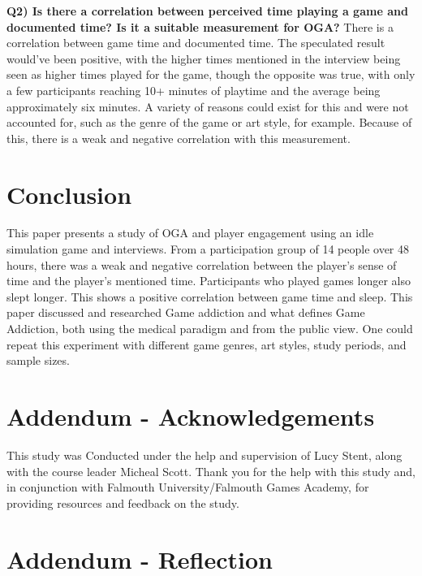 \documentclass[conference]{IEEEtran}
\begin{document}
 \textbf{Q2) Is there a correlation between perceived time playing a game and documented time? Is it a suitable measurement for OGA?}
There is a correlation between game time and documented time. The speculated result would’ve been positive, with the higher times mentioned in the interview being seen as higher times played for the game, though the opposite was true, with only a few participants reaching 10+ minutes of playtime and the average being approximately six minutes. A variety of reasons could exist for this and were not accounted for, such as the genre of the game or art style, for example. Because of this, there is a weak and negative correlation with this measurement.

\section{Conclusion}
This paper presents a study of OGA and player engagement using an idle simulation game and interviews. From a participation group of 14 people over 48 hours, there was a weak and negative correlation between the player’s sense of time and the player’s mentioned time. Participants who played games longer also slept longer. This shows a positive correlation between game time and sleep. This paper discussed and researched Game addiction and what defines Game Addiction, both using the medical paradigm and from the public view. One could repeat this experiment with different game genres, art styles, study periods, and sample sizes.
 

 
\section{Addendum - Acknowledgements}
This study was Conducted under the help and supervision of Lucy Stent, along with the course leader Micheal Scott. Thank you for the help with this study and, in conjunction with Falmouth University/Falmouth Games Academy, for providing resources and feedback on the study.
\section {Addendum - Reflection}
\end{document}
